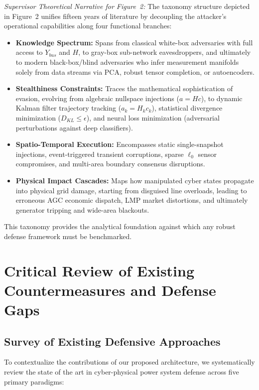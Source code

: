 \documentclass[journal,compsoc]{IEEEtran}
\begin{document}
\textit{Supervisor Theoretical Narrative for Figure~2:}
The taxonomy structure depicted in Figure~2 unifies fifteen years of literature by decoupling the attacker's operational capabilities along four functional branches:
\begin{itemize}
    \item \textbf{Knowledge Spectrum:} Spans from classical white-box adversaries with full access to $Y_{bus}$ and $H$, to gray-box sub-network eavesdroppers, and ultimately to modern black-box/blind adversaries who infer measurement manifolds solely from data streams via PCA, robust tensor completion, or autoencoders.
    \item \textbf{Stealthiness Constraints:} Traces the mathematical sophistication of evasion, evolving from algebraic nullspace injections ($a = Hc$), to dynamic Kalman filter trajectory tracking ($a_k = H_k c_k$), statistical divergence minimization ($D_{KL} \le \epsilon$), and neural loss minimization (adversarial perturbations against deep classifiers).
    \item \textbf{Spatio-Temporal Execution:} Encompasses static single-snapshot injections, event-triggered transient corruptions, sparse $\ell_0$ sensor compromises, and multi-area boundary consensus disruptions.
    \item \textbf{Physical Impact Cascades:} Maps how manipulated cyber states propagate into physical grid damage, starting from disguised line overloads, leading to erroneous AGC economic dispatch, LMP market distortions, and ultimately generator tripping and wide-area blackouts.
\end{itemize}
This taxonomy provides the analytical foundation against which any robust defense framework must be benchmarked.


\section{Critical Review of Existing Countermeasures and Defense Gaps}
\label{sec:countermeasures}

\subsection{Survey of Existing Defensive Approaches}
To contextualize the contributions of our proposed architecture, we systematically review the state of the art in cyber-physical power system defense across five primary paradigms:
\end{document}
